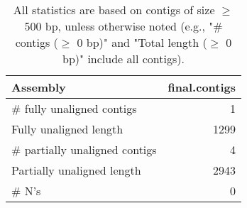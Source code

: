 \documentclass[12pt,a4paper]{article}
\begin{document}
\begin{table}[ht]
\begin{center}
\caption{All statistics are based on contigs of size $\geq$ 500 bp, unless otherwise noted (e.g., "\# contigs ($\geq$ 0 bp)" and "Total length ($\geq$ 0 bp)" include all contigs).}
\begin{tabular}{|l*{1}{|r}|}
\hline
Assembly & final.contigs \\ \hline
\# fully unaligned contigs & 1 \\ \hline
Fully unaligned length & 1299 \\ \hline
\# partially unaligned contigs & 4 \\ \hline
Partially unaligned length & 2943 \\ \hline
\# N's & 0 \\ \hline
\end{tabular}
\end{center}
\end{table}
\end{document}

